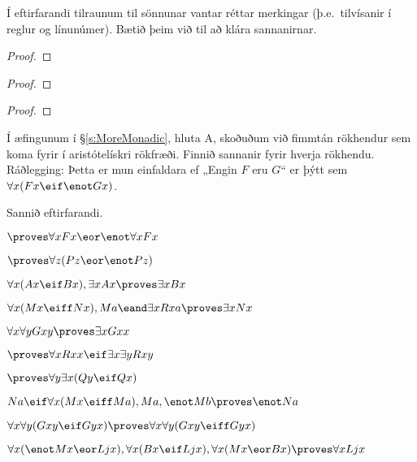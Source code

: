 \problempart 
\label{pr.justifyFOLproof}
Í eftirfarandi tilraunum til sönnunar vantar réttar merkingar (þ.e.\ tilvísanir í reglur og línunúmer). Bætið þeim við til að klára sannanirnar.
\begin{proof}
	\open
	\close
{} {}
\end{proof}
\begin{multicols}{2}
\begin{proof}
 {}
 {}
\end{proof}
\begin{proof}
\open
\close
{}
\end{proof}
\end{multicols}


\problempart
\label{pr.BarbaraEtc.proof1}
Í æfingunum í \S\ref{s:MoreMonadic}, hluta A, skoðuðum við fimmtán rökhendur sem koma fyrir í aristótelískri rökfræði. Finnið sannanir fyrir hverja rökhendu. Ráðlegging: Þetta er mun einfaldara ef „Engin $F$ eru $G$“ er þýtt sem $\forall x (Fx \eif \enot Gx)$.
\

\problempart
\label{pr.someFOLproofs}
Sannið eftirfarandi.
\begin{earg}
\item $\proves \forall x Fx \eor \enot \forall x Fx$
\item $\proves\forall z (Pz \eor \enot Pz)$
\item $\forall x(Ax\eif Bx), \exists x Ax \proves \exists x Bx$
\item $\forall x(Mx \eiff Nx), Ma\eand\exists x Rxa\proves \exists x Nx$
\item $\forall x \forall y Gxy\proves\exists x Gxx$
\item $\proves\forall x Rxx\eif \exists x \exists y Rxy$
\item $\proves\forall y \exists x (Qy \eif Qx)$
\item $Na \eif \forall x(Mx \eiff Ma), Ma, \enot Mb\proves \enot Na$
\item $\forall x \forall y (Gxy \eif Gyx) \proves \forall x\forall y (Gxy \eiff Gyx)$
\item $\forall x(\enot Mx \eor Ljx), \forall x(Bx\eif Ljx), \forall x(Mx\eor Bx)\proves \forall xLjx$
\end{earg}


